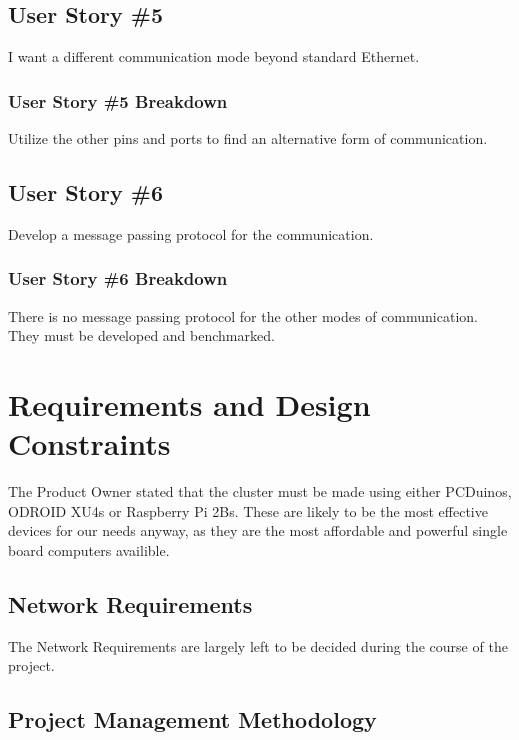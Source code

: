 \subsection{User Story \#5} 
I want a different communication mode beyond standard Ethernet.
\subsubsection{User Story \#5 Breakdown}
Utilize the other pins and ports to find an alternative form of communication.

\subsection{User Story \#6} 
Develop a message passing protocol for the communication.
\subsubsection{User Story \#6 Breakdown}
There is no message passing protocol for the other modes of communication. They must be developed and benchmarked.

\section{Requirements and Design Constraints}

The Product Owner stated that the cluster must be made using either PCDuinos, ODROID XU4s or Raspberry Pi 2Bs. These are likely to be  the most effective devices for our needs anyway, as they are the most affordable and powerful single board computers availible.


\subsection{Network Requirements}
The Network Requirements are largely left to be decided during the course of the project. 

\subsection{Project  Management Methodology}


